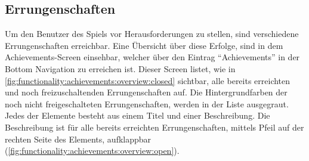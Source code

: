 \documentclass[a4paper]{article}
\begin{document}
\subsection{Errungenschaften}
\label{subsec:functionality:achievements}
Um den Benutzer des Spiels vor Herausforderungen zu stellen, sind verschiedene Errungenschaften erreichbar. Eine Übersicht über diese Erfolge, sind in dem Achievements-Screen einsehbar, welcher über den Eintrag "`Achievements"' in der Bottom Navigation zu erreichen ist. Dieser Screen listet, wie in \autoref{fig:functionality:achievements:overview:closed} sichtbar, alle bereits erreichten und noch freizuschaltenden Errungenschaften auf. Die Hintergrundfarben der noch nicht freigeschalteten Errungenschaften, werden in der Liste ausgegraut. Jedes der Elemente besteht aus einem Titel und einer Beschreibung. Die Beschreibung ist für alle bereits erreichten Errungenschaften, mittels Pfeil auf der rechten Seite des Elements, aufklappbar (\autoref{fig:functionality:achievements:overview:open}).
\end{document}
